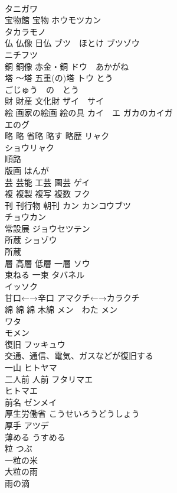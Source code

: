 \documentclass[8pt]{extreport}
\begin{document}
\begin{CJK}{UTF8}{min}
\\	タニガワ 
\\	宝物館 宝物	ホウモツカン 
\\	タカラモノ 
\\	仏 仏像 日仏	ブツ　ほとけ ブツゾウ 
\\	ニチフツ 
\\	銅 銅像 赤金・銅	ドウ　あかがね 
\\	塔 〜塔 五重(の)塔	トウ とう 
\\	ごじゅう　の　とう 
\\	財 財産 文化財	ザイ　サイ 
\\	絵 画家の絵画 絵の具	カイ　エ ガカのカイガ
\\	エのグ
\\	略 略 省略 略す 略歴	リャク 
\\	ショウリャク
\\	順路	
\\	版画	はんが 
\\	芸 芸能 工芸 園芸	ゲイ 
\\	複 複製 複写 複数	フク 
\\	刊 刊行物 朝刊	カン カンコウブツ 
\\	チョウカン 
\\	常設展	ジョウセツテン 
\\	所蔵	ショゾウ 
\\	所蔵
\\	層 高層 低層 一層	ソウ 
\\	束ねる 一束	タバネル 
\\	イッソク 
\\	甘口←→辛口	アマクチ←→カラクチ
\\	綿 綿 綿 木綿	メン　わた メン 
\\	ワタ 
\\	モメン 
\\	復旧	フッキュウ 
\\	交通、通信、電気、ガスなどが復旧する
\\	一山	ヒトヤマ 
\\	二人前 人前	フタリマエ 
\\	ヒトマエ 
\\	前名	ゼンメイ 
\\	厚生労働省	こうせいろうどうしょう 
\\	厚手	アツデ 
\\	薄める	うすめる 
\\	粒	つぶ 
\\	一粒の米 
\\	大粒の雨 
\\	雨の滴

\end{CJK}
\end{document}
